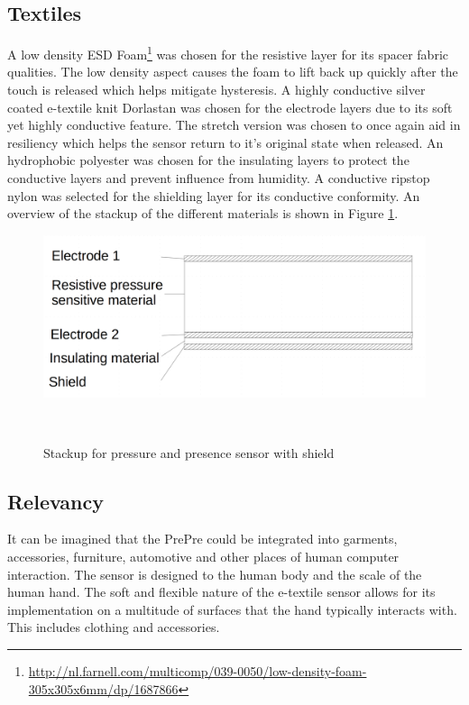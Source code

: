 \documentclass{sigchi-ext}
\begin{document}
\subsection{Textiles}
A low density ESD Foam\footnote{\url{http://nl.farnell.com/multicomp/039-0050/low-density-foam-305x305x6mm/dp/1687866}} was chosen for the resistive layer for its spacer fabric qualities.  The low density aspect causes the foam to lift back up quickly after the touch is released which helps mitigate hysteresis. A highly conductive silver coated e-textile knit Dorlastan was chosen for the electrode layers due to its soft yet highly conductive feature. The stretch version was chosen to once again aid in resiliency which helps the sensor return to it's original state when released.  An hydrophobic polyester was chosen for the insulating layers to protect the conductive layers and prevent influence from humidity.  A conductive ripstop nylon was selected for the shielding layer for its conductive conformity. An overview of the stackup of the different materials is shown in Figure \ref{fig:stackup}.


\begin{figure}[!htbp]
\centering
  \includegraphics[width=0.9\columnwidth]{figures/stackup}
  \caption{Stackup for pressure and presence sensor with
shield}~\label{fig:stackup}
\end{figure}

\subsection{Relevancy}
It can be imagined that the PrePre could be integrated into garments, accessories, furniture, automotive and other places of human computer interaction.  The sensor is designed to the human body and the scale of the human hand.  The soft and flexible nature of the e-textile sensor allows for its implementation on a multitude of surfaces that the hand typically interacts with.  This includes clothing and accessories. 
\end{document}

